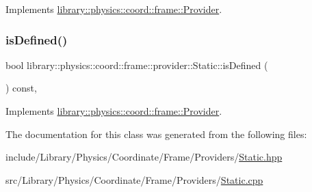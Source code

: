 Implements \hyperlink{classlibrary_1_1physics_1_1coord_1_1frame_1_1_provider_a796fd2dd337f1304a0e9acf573ce2550}{library\+::physics\+::coord\+::frame\+::\+Provider}.

\mbox{\label{classlibrary_1_1physics_1_1coord_1_1frame_1_1provider_1_1_static_a508f20f859dbc43759ab64e03b5befa1}} 
\subsubsection{\texorpdfstring{is\+Defined()}{isDefined()}}
{\footnotesize\ttfamily bool library\+::physics\+::coord\+::frame\+::provider\+::\+Static\+::is\+Defined (\begin{DoxyParamCaption}{ }\end{DoxyParamCaption}) const\hspace{0.3cm}{\ttfamily [override]}, {\ttfamily [virtual]}}



Implements \hyperlink{classlibrary_1_1physics_1_1coord_1_1frame_1_1_provider_ae7cd093febf2b20f71400f9f79442774}{library\+::physics\+::coord\+::frame\+::\+Provider}.



The documentation for this class was generated from the following files\+:\begin{DoxyCompactItemize}
\item 
include/\+Library/\+Physics/\+Coordinate/\+Frame/\+Providers/\hyperlink{_static_8hpp}{Static.\+hpp}\item 
src/\+Library/\+Physics/\+Coordinate/\+Frame/\+Providers/\hyperlink{_static_8cpp}{Static.\+cpp}\end{DoxyCompactItemize}

